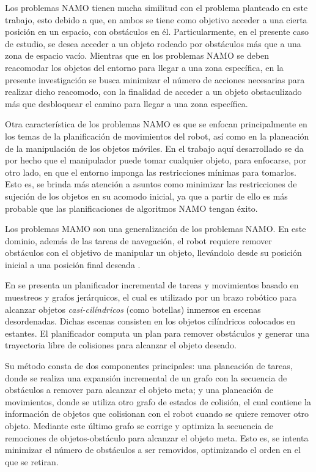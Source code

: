%
Los problemas NAMO tienen mucha similitud con el problema planteado en este trabajo, esto debido a que, en ambos se tiene como objetivo acceder a una cierta posición en un espacio, con obstáculos en él.
Particularmente, en el presente caso de estudio, se desea acceder a un objeto rodeado por obstáculos más que a una zona de espacio vacío.
Mientras que en los problemas NAMO se deben reacomodar los objetos del entorno para llegar a una zona específica, en la presente investigación se busca minimizar el número de acciones necesarias para realizar dicho reacomodo, con la finalidad de acceder a un objeto obstaculizado más que desbloquear el camino para llegar a una zona específica.

Otra característica de los problemas NAMO es que se enfocan principalmente en los temas de la planificación de movimientos del robot, así como en la planeación de la manipulación de los objetos móviles.
En el trabajo aquí desarrollado se da por hecho que el manipulador puede tomar cualquier objeto, para enfocarse, por otro lado, en que el entorno imponga las restricciones mínimas para tomarlos.
Esto es, se brinda más atención a asuntos como minimizar las restricciones de sujeción de los objetos en su acomodo inicial, ya que a partir de ello es más probable que las planificaciones de algoritmos NAMO tengan éxito.
%
%
%
%

Los problemas MAMO son una generalización de los problemas NAMO.
En este dominio, además de las tareas de navegación, el robot requiere remover obstáculos con el objetivo de manipular un objeto, llevándolo desde su posición inicial a una posición final deseada \cite{4209604}.

En \cite{9863895} se presenta un planificador incremental de tareas y movimientos basado en muestreos y grafos jerárquicos, el cual es utilizado por un brazo robótico para alcanzar objetos \textsl{casi-cilíndricos} (como botellas) inmersos en escenas desordenadas.
Dichas escenas consisten en los objetos cilíndricos colocados en estantes.
El planificador computa un plan para remover obstáculos y generar una trayectoria libre de colisiones para alcanzar el objeto deseado.

Su método consta de dos componentes principales: una planeación de tareas, donde se realiza una expansión incremental de un grafo con la secuencia de obstáculos a remover para alcanzar el objeto meta; y una planeación de movimientos, donde se utiliza otro grafo de estados de colisión, el cual contiene la información de objetos que colisionan con el robot cuando se quiere remover otro objeto.
Mediante este último grafo se corrige y optimiza la secuencia de remociones de objetos-obstáculo para alcanzar el objeto meta.
Esto es, se intenta minimizar el número de obstáculos a ser removidos, optimizando el orden en el que se retiran.

